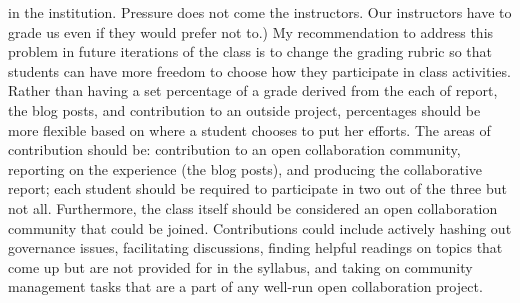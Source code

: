 in the institution. Pressure does not come the instructors. Our instructors have to grade 
us even if they would prefer not to.) My recommendation to address this problem in future 
iterations of the class is to change the grading rubric so that students can have more freedom 
to choose how they participate in class activities. Rather than having a set percentage of 
a grade derived from the each of report, the blog posts, and contribution to an outside project, 
percentages should be more flexible based on where a student chooses to put her efforts. 
The areas of contribution should be: contribution to an open collaboration community, reporting on 
the experience (the blog posts), and producing the collaborative report; each student should be 
required to participate in two out of the three but not all. Furthermore, the class itself 
should be considered an open collaboration community that could be joined. Contributions 
could include actively hashing out governance issues, facilitating discussions, finding 
helpful readings on topics that come up but are not provided for in the syllabus, and taking on 
community management tasks that are a part of any well-run open collaboration project. 

